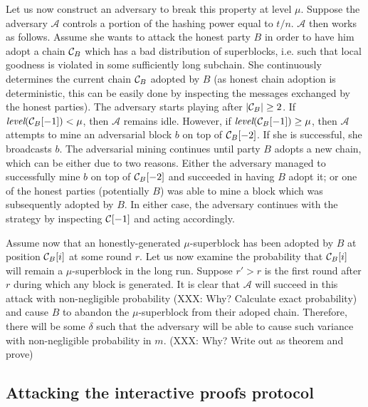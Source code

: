 Let us now construct an adversary to break this property at level $\mu$. Suppose
the adversary $\mathcal{A}$ controls a portion of the hashing power equal to
$t/n$. $\mathcal{A}$ then works as follows. Assume she wants to attack the
honest party $B$ in order to have him adopt a chain $\mathcal{C}_B$ which has a bad
distribution of superblocks, i.e. such that local goodness is violated in some
sufficiently long subchain. She continuously determines the current chain
$\mathcal{C}_B$ adopted by $B$ (as honest chain adoption is deterministic, this can
be easily done by inspecting the messages exchanged by the honest parties). The
adversary starts playing after $|\mathcal{C}_B| \geq 2$. If
$\textit{level}(\mathcal{C}_B[-1]) < \mu$, then $\mathcal{A}$ remains idle. However,
if $\textit{level}(\mathcal{C}_B[-1]) \geq \mu$, then $\mathcal{A}$ attempts to mine
an adversarial block $b$ on top of $\mathcal{C}_B[-2]$. If she is successful, she
broadcasts $b$. The adversarial mining continues until party $B$ adopts a new
chain, which can be either due to two reasons. Either the adversary managed to
successfully mine $b$ on top of $\mathcal{C}_B[-2]$ and succeeded in having $B$ adopt
it; or one of the honest parties (potentially $B$) was able to mine a block
which was subsequently adopted by $B$. In either case, the adversary continues
with the strategy by inspecting $\mathcal{C}[-1]$ and acting accordingly.

Assume now that an honestly-generated $\mu$-superblock has been adopted by $B$
at position $\mathcal{C}_B[i]$ at some round $r$. Let us now examine the probability
that $\mathcal{C}_B[i]$ will remain a $\mu$-superblock in the long run. Suppose $r' >
r$ is the first round after $r$ during which any block is generated.
It is clear
that $\mathcal{A}$ will succeed in this attack with non-negligible probability
(XXX: Why? Calculate exact probability)
and cause $B$ to abandon the $\mu$-superblock from their adoped chain.
Therefore, there will be some $\delta$ such that the adversary will be able to
cause such variance with non-negligible probability in $m$.
(XXX: Why? Write out as theorem and prove)

\subsection{Attacking the interactive proofs protocol}


